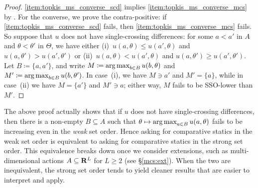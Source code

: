\begin{proof}
	\ref{item:topkis_ms_converse_scd} implies \ref{item:topkis_ms_converse_mcs} by . For the converse, we prove the contra-positive: if \ref{item:topkis_ms_converse_scd} fails, then \ref{item:topkis_ms_converse_mcs} fails. So suppose that $u$ does not have single-crossing differences: for some $a<a'$ in $A$ and $\theta < \theta'$ in $\Theta$, we have either (i)~$u(a,\theta) \leq u(a',\theta)$ and $u(a,\theta') > u(a',\theta')$ or (ii)~$u(a,\theta) < u(a',\theta)$ and $u(a,\theta') \geq u(a',\theta')$. Let $B \coloneqq \{a,a'\}$, and write $M \coloneqq \operatorname*{arg\,max}_{b \in B} u(b,\theta)$ and $M' \coloneqq \operatorname*{arg\,max}_{b \in B} u(b,\theta')$. In case~(i), we have $M \ni a'$ and $M' = \{a\}$, while in case~(ii) we have $M = \{a'\}$ and $M' \ni a$; either way, $M$ fails to be SSO-lower than $M'$.
\end{proof}

\begin{remark}
	\label{remark:mcs_wso}
	The above proof actually shows that if $u$ does not have single-crossing differences, then there is a non-empty $B \subseteq A$ such that $\theta \mapsto \operatorname*{arg\,max}_{a \in B} u(a,\theta)$ fails to be increasing even in the \emph{weak} set order. Hence asking for comparative statics in the weak set order is equivalent to asking for comparative statics in the strong set order. This equivalence breaks down once we consider extensions, such as multi-dimensional actions $A \subseteq \mathbf{R}^L$ for $L \geq 2$ (see §\ref{mcs:ext}). When the two are inequivalent, the strong set order tends to yield cleaner results that are easier to interpret and apply.
\end{remark}

